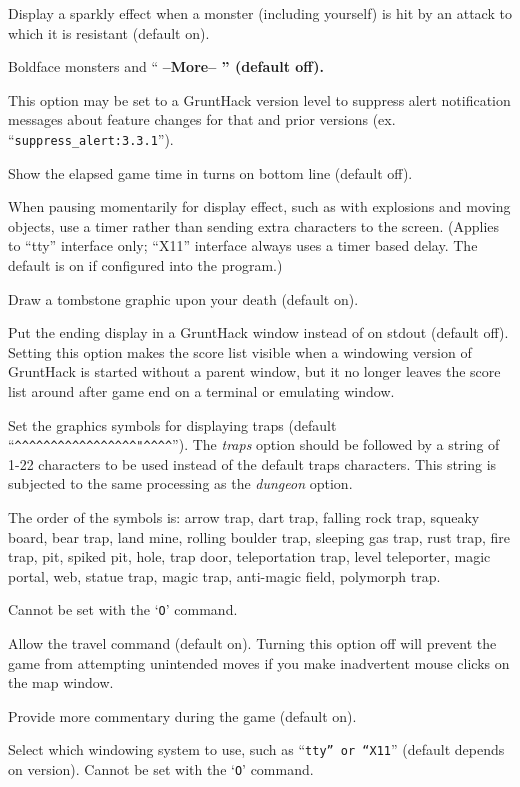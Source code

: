Display a sparkly effect when a monster (including yourself) is hit by an
attack to which it is resistant (default on).
\item[\tb{standout}]
Boldface monsters and ``%
\bf --More--\rm%
'' (default off).
\item[\tb{suppress\_alert}]
This option may be set to a GruntHack version level to suppress
alert notification messages about feature changes for that 
and prior versions (ex. ``{\tt suppress\_alert:3.3.1}'').
\item[\tb{"time    "}]
Show the elapsed game time in turns on bottom line (default off).
\item[\tb{timed\_delay}]
When pausing momentarily for display effect, such as with explosions and
moving objects, use a timer rather than sending extra characters to the
screen.  (Applies to ``tty'' interface only; ``X11'' interface always
uses a timer based delay.  The default is on if configured into the
program.)
\item[\tb{tombstone}]
Draw a tombstone graphic upon your death (default on).
\item[\tb{toptenwin}]
Put the ending display in a GruntHack window instead of on stdout (default off).
Setting this option makes the score list visible when a windowing version
of GruntHack is started without a parent window, but it no longer leaves
the score list around after game end on a terminal or emulating window.
\item[\tb{traps}]
Set the graphics symbols for displaying traps (default
``\verb&^^^^^^^^^^^^^^^^^"^^^^&'').
The
{\it traps }
option should be followed by a string of 1-22
characters to be used instead of the default traps characters.
This string is subjected to the same processing as the
{\it dungeon }
option.

The order of the symbols is: 
arrow trap, dart trap, falling rock trap, squeaky board, bear trap,
land mine, rolling boulder trap, sleeping gas trap, rust trap, fire trap,
pit, spiked pit, hole, trap door, teleportation trap, level teleporter,
magic portal, web, statue trap, magic trap, anti-magic field, polymorph trap.

Cannot be set with the `{\tt O}' command.
\item[\tb{travel}]
Allow the travel command (default on).  Turning this option off will
prevent the game from attempting unintended moves if you make inadvertent
mouse clicks on the map window.
\item[\tb{verbose}]
Provide more commentary during the game (default on).
\item[\tb{windowtype}]
Select which windowing system to use, such as ``{\tt tty'' or ``X11}''
(default depends on version).
Cannot be set with the `{\tt O}' command.
\elist
